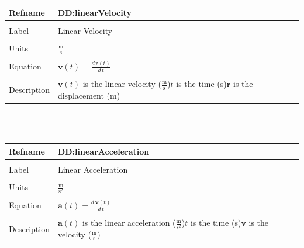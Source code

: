 \documentclass[12pt]{article}
\begin{document}
~\newline
\noindent \begin{minipage}{\textwidth}
\begin{tabular}{p{} p{}}
\toprule \textbf{Refname} & \textbf{DD:linearVelocity}
\label{DD:linearVelocity}
\\ \midrule \\
Label & Linear Velocity
\\ \midrule \\
Units & $\frac{\text{m}}{\text{s}}$
\\ \midrule \\
Equation & $\mathbf{v}(t)=\frac{d\,\mathbf{r}\left(t\right)}{d\,t}$
\\ \midrule \\
Description & $\mathbf{v}(t)$ is the linear velocity ($\frac{\text{m}}{\text{s}}$)\newline$t$ is the time (s)\newline$\mathbf{r}$ is the displacement (m)
\\ \bottomrule \end{tabular}
\end{minipage}\\
~\newline
\noindent \begin{minipage}{\textwidth}
\begin{tabular}{p{} p{}}
\toprule \textbf{Refname} & \textbf{DD:linearAcceleration}
\label{DD:linearAcceleration}
\\ \midrule \\
Label & Linear Acceleration
\\ \midrule \\
Units & $\frac{\text{m}}{\text{s}^{2}}$
\\ \midrule \\
Equation & $\mathbf{a}(t)=\frac{d\,\mathbf{v}\left(t\right)}{d\,t}$
\\ \midrule \\
Description & $\mathbf{a}(t)$ is the linear acceleration ($\frac{\text{m}}{\text{s}^{2}}$)\newline$t$ is the time (s)\newline$\mathbf{v}$ is the velocity ($\frac{\text{m}}{\text{s}}$)
\\ \bottomrule \end{tabular}
\end{minipage}\\
~\newline
\end{document}
